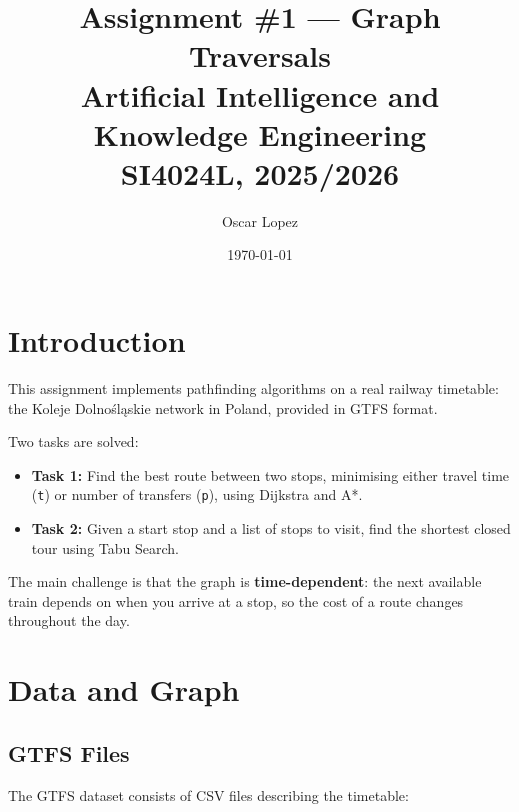 \documentclass[12pt,a4paper]{article}
\title{
  \textbf{Assignment \#1 — Graph Traversals}\\[0.4em]
  \large Artificial Intelligence and Knowledge Engineering\\
  SI4024L, 2025/2026
}
\author{Oscar Lopez}
\date{\today}
\begin{document}
\maketitle
\tableofcontents
\newpage

\section{Introduction}

This assignment implements pathfinding algorithms on a real railway timetable:
the Koleje Dolnośląskie network in Poland, provided in GTFS format.

Two tasks are solved:

\begin{itemize}
  \item \textbf{Task 1:} Find the best route between two stops, minimising
        either travel time (\texttt{t}) or number of transfers (\texttt{p}),
        using Dijkstra and A*.
  \item \textbf{Task 2:} Given a start stop and a list of stops to visit,
        find the shortest closed tour using Tabu Search.
\end{itemize}

The main challenge is that the graph is \textbf{time-dependent}: the next
available train depends on when you arrive at a stop, so the cost of a route
changes throughout the day.

\section{Data and Graph}

\subsection{GTFS Files}

The GTFS dataset consists of CSV files describing the timetable:
\end{document}
